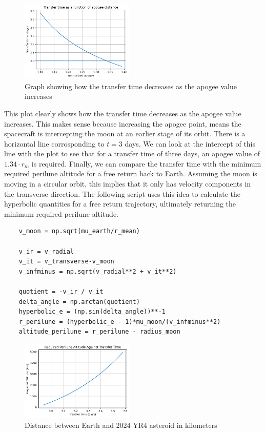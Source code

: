 \documentclass[12pt,twocolumn]{article}  %
\begin{document}
\begin{figure}[H]
    \centering
    \includegraphics[width=0.48\textwidth]{Images/222-time.png}
    \caption{Graph showing how the transfer time decreases as the apogee value increases}
\end{figure}

This plot clearly shows how the transfer time decreases as the apogee value increases. This makes sense because increasing the 
apogee point, means the spacecraft is intercepting the moon at an earlier stage of its orbit.
There is a horizontal line corrosponding to $t=3$ days. We can look at the intercept of this line with the plot to see that for a 
transfer time of three days, an apogee value of $1.34\cdot r_m$ is required.
\vspace{0.75cm}
\newline
Finally, we can compare the transfer time with the minimum required perilune altitude for a free return back to Earth.
Assuming the moon is moving in a circular orbit, this implies that it only has velocity components in the transverse direction.
The following script uses this idea to calculate the hyperbolic quantities for a free return trajectory, ultimately returning the 
minimum required perilune altitude.
\begin{lstlisting}
    v_moon = np.sqrt(mu_earth/r_mean)

    v_ir = v_radial
    v_it = v_transverse-v_moon
    v_infminus = np.sqrt(v_radial**2 + v_it**2)
    
    quotient = -v_ir / v_it
    delta_angle = np.arctan(quotient)
    hyperbolic_e = (np.sin(delta_angle))**-1
    r_perilune = (hyperbolic_e - 1)*mu_moon/(v_infminus**2)
    altitude_perilune = r_perilune - radius_moon
\end{lstlisting}
\begin{figure}[H]
    \centering
    \includegraphics[width=0.48\textwidth]{Images/223-altitude.png}
    \caption{Distance between Earth and 2024 YR4 asteroid in kilometers}
\end{figure}
\end{document}
